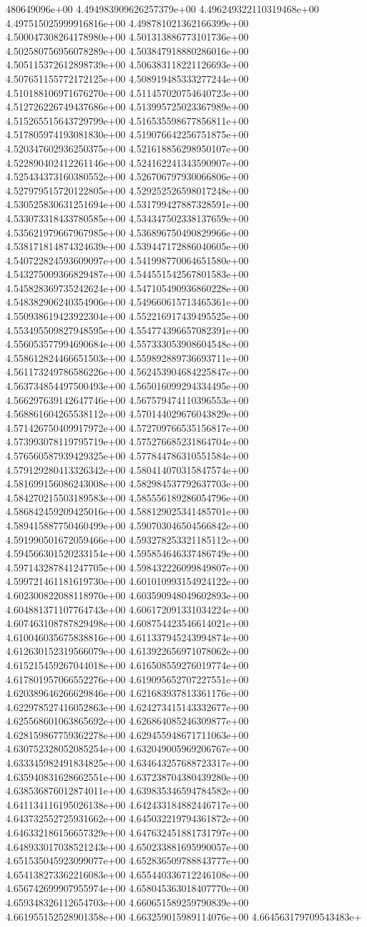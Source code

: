 480649096e+00	4.494983909626257379e+00	4.496249322110319468e+00	4.497515025999916816e+00	4.498781021362166399e+00	4.500047308264178980e+00	4.501313886773101736e+00	4.502580756956078289e+00	4.503847918880286016e+00	4.505115372612898739e+00	4.506383118221126693e+00	4.507651155772172125e+00	4.508919485333277244e+00	4.510188106971676270e+00	4.511457020754640723e+00	4.512726226749437686e+00	4.513995725023367989e+00	4.515265515643729799e+00	4.516535598677856811e+00	4.517805974193081830e+00	4.519076642256751875e+00	4.520347602936250375e+00	4.521618856298950107e+00	4.522890402412261146e+00	4.524162241343590907e+00	4.525434373160380552e+00	4.526706797930066806e+00	4.527979515720122805e+00	4.529252526598017248e+00	4.530525830631251694e+00	4.531799427887328591e+00	4.533073318433780585e+00	4.534347502338137659e+00	4.535621979667967985e+00	4.536896750490829966e+00	4.538171814874324639e+00	4.539447172886040605e+00	4.540722824593609097e+00	4.541998770064651580e+00	4.543275009366829487e+00	4.544551542567801583e+00	4.545828369735242624e+00	4.547105490936860228e+00	4.548382906240354906e+00	4.549660615713465361e+00	4.550938619423922304e+00	4.552216917439495525e+00	4.553495509827948595e+00	4.554774396657082391e+00	4.556053577994690684e+00	4.557333053908604548e+00	4.558612824466651503e+00	4.559892889736693711e+00	4.561173249786586226e+00	4.562453904684225847e+00	4.563734854497500493e+00	4.565016099294334495e+00	4.566297639142647746e+00	4.567579474110396553e+00	4.568861604265538112e+00	4.570144029676043829e+00	4.571426750409917972e+00	4.572709766535156817e+00	4.573993078119795719e+00	4.575276685231864704e+00	4.576560587939429325e+00	4.577844786310551584e+00	4.579129280413326342e+00	4.580414070315847574e+00	4.581699156086243008e+00	4.582984537792637703e+00	4.584270215503189583e+00	4.585556189286054796e+00	4.586842459209425016e+00	4.588129025341485701e+00	4.589415887750460499e+00	4.590703046504566842e+00	4.591990501672059466e+00	4.593278253321185112e+00	4.594566301520233154e+00	4.595854646337486749e+00	4.597143287841247705e+00	4.598432226099849807e+00	4.599721461181619730e+00	4.601010993154924122e+00	4.602300822088118970e+00	4.603590948049602893e+00	4.604881371107764743e+00	4.606172091331034224e+00	4.607463108787829498e+00	4.608754423546614021e+00	4.610046035675838816e+00	4.611337945243994874e+00	4.612630152319566079e+00	4.613922656971078062e+00	4.615215459267044018e+00	4.616508559276019774e+00	4.617801957066552276e+00	4.619095652707227551e+00	4.620389646266629846e+00	4.621683937813361176e+00	4.622978527416052863e+00	4.624273415143332677e+00	4.625568601063865692e+00	4.626864085246309877e+00	4.628159867759362278e+00	4.629455948671711063e+00	4.630752328052085254e+00	4.632049005969206767e+00	4.633345982491834825e+00	4.634643257688723317e+00	4.635940831628662551e+00	4.637238704380439280e+00	4.638536876012874011e+00	4.639835346594784582e+00	4.641134116195026138e+00	4.642433184882446717e+00	4.643732552725931662e+00	4.645032219794361872e+00	4.646332186156657329e+00	4.647632451881731797e+00	4.648933017038521243e+00	4.650233881695990057e+00	4.651535045923099077e+00	4.652836509788843777e+00	4.654138273362216083e+00	4.655440336712246108e+00	4.656742699907955974e+00	4.658045363018407770e+00	4.659348326112654703e+00	4.660651589259790839e+00	4.661955152528901358e+00	4.663259015989114076e+00	4.664563179709543483e+